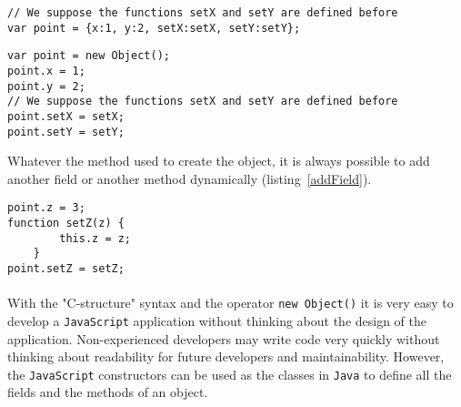 \begin{lstlisting}[caption=Creating an object with the "C-structure" syntax, label={way2}]
// We suppose the functions setX and setY are defined before
var point = {x:1, y:2, setX:setX, setY:setY};
\end{lstlisting}

\begin{lstlisting}[caption=Creating an object with the operator "new Object()", label={way3}]
var point = new Object();
point.x = 1;
point.y = 2;
// We suppose the functions setX and setY are defined before
point.setX = setX;
point.setY = setY;
\end{lstlisting}

Whatever the method used to create the object, it is always possible to add another field or another method dynamically (listing~\ref{addField}).
\begin{lstlisting}[caption=Adding a new field or a new method dynamically", label={addField}]
point.z = 3;
function setZ(z) {
        this.z = z;
    }
point.setZ = setZ;
\end{lstlisting}

\paragraph{}
With the "C-structure" syntax and the operator \texttt{new Object()} it is very easy to develop a \texttt{JavaScript} application without thinking about the design of the application. Non-experienced developers may write code very quickly without thinking about readability for future developers and maintainability. However, the \texttt{JavaScript} constructors can be used as the classes in \texttt{Java} to define all the fields and the methods of an object.


